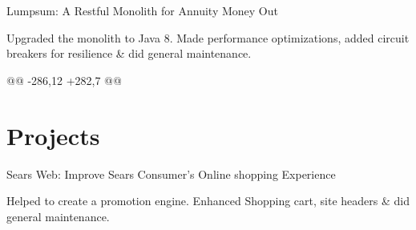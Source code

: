 \documentclass[]{de-resume}
\begin{document}
\begin{minipage}[t]{0.66\textwidth}
\subsectionsep
\subsectionsep
 \subsectionsep
 \begin{tightemize}
 \item Lumpsum: A Restful Monolith for Annuity Money Out
 	\begin{tightemize}
 		\sectionsep
 		\item Upgraded the monolith to Java 8. Made performance optimizations, added circuit breakers for resilience \& did general maintenance.
 		\sectionsep
 	\end{tightemize}
 \end{tightemize}


    
        
          
    

        
    
    @@ -286,12 +282,7 @@ \section{Projects}
  
\subsectionsep
 \subsectionsep
 \begin{tightemize}
 \item Sears Web: Improve Sears Consumer's Online shopping Experience
 	\begin{tightemize}
 		\sectionsep
 		\item Helped to create a promotion engine. Enhanced Shopping cart, site headers \& did general maintenance.
 		\sectionsep
 	\end{tightemize}
 \end{tightemize}

 \end{minipage} 

    
          
            
    

          
    
    
  
\end{document}

